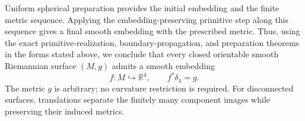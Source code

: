 \documentclass[11pt,a4paper]{article}
\newcommand{\R}{\mathbb R}
\theoremstyle{definition}
\theoremstyle{remark}
\numberwithin{equation}{section}
\begin{document}
Uniform spherical preparation provides the initial embedding and the
finite metric sequence. Applying the embedding-preserving primitive step
along this sequence gives a final smooth embedding with the prescribed
metric. Thus, using the exact primitive-realization, boundary-propagation,
and preparation theorems in the forms stated above, we conclude that every
closed orientable smooth Riemannian surface $(M,g)$ admits a smooth embedding
\[
 \boxed{f:M\hookrightarrow\R^4,\qquad f^*\delta_4=g.}
\]
The metric $g$ is arbitrary; no curvature restriction is required. For disconnected surfaces, translations separate the finitely
many component images while preserving their induced metrics.
\end{document}
